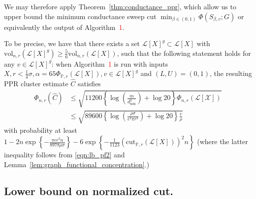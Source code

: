 \documentclass[11pt,twoside]{article}
\newcommand{\set}[1]{\left\{#1\right\}}
\newcommand{\vol}{\mathrm{vol}}
\newcommand{\cut}{\mathrm{cut}}
\newcommand{\1}{\mathbf{1}}
\newcommand{\Xbf}{X}             %
\newcommand{\Pbb}{\mathbb{P}}
\begin{document}
We may therefore apply Theorem~\ref{thm:conductance_ppr}, which allow us to upper bound the minimum conductance sweep cut $\min_{\beta \in (0,1)}\Phi(S_{\beta,v};G)$ or equivalently the output of Algorithm~\textcolor{red}{1}.

To be precise, we have that there exists a set $\mathcal{L}[\Xbf]^g \subset \mathcal{L}[\Xbf]$ with $\vol_{n,r}(\mathcal{L}[\Xbf]^g) \geq \frac{5}{6} \vol_{n,r}(\mathcal{L}[\Xbf])$, such that the following statement holds for any $v \in \mathcal{L}[\Xbf]^g$: when Algorithm~\textcolor{red}{1} is run with inputs $\Xbf, r < \frac{1}{4}\sigma,\alpha = 65 \Phi_{\Pbb,r}(\mathcal{L}[\Xbf]),v \in \mathcal{L}[\Xbf]^g$ and $(L,U) = (0,1)$, the resulting PPR cluster estimate $\widehat{C}$ satisfies
\begin{align}
\Phi_{n,r}(\widehat{C}) & \leq \sqrt{11200\left\{\log\left(\frac{m}{d_{\min}^2}\right) + \log 20\right\} \Phi_{n,r}(\mathcal{L[X]})} \nonumber \\
& \leq \sqrt{89600\left\{\log\left(\frac{\rho \sigma}{\epsilon^2 \pi r^2}\right) + \log 20\right\} \frac{r}{\rho}} \label{eqn:lb_pf4} 
\end{align}
with probability at least $1 - 2n\exp\set{-\frac{\pi\epsilon r^2 n}{8978 \rho \sigma}} - 6 \exp\set{-\frac{1}{1123}(\cut_{\Pbb,r}(\mathcal{L}[\Xbf]))^2n}$ (where the latter inequality follows from \eqref{eqn:lb_pf2} and Lemma~\ref{lem:graph_functional_concentration}.)

\subsection{Lower bound on normalized cut.}
\end{document}
